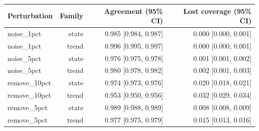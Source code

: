 \begin{tabular}{lrrr}
\toprule
Perturbation & Family & Agreement (95\% CI) & Lost coverage (95\% CI) \\
\midrule
noise\_1pct & state & 0.985 [0.984, 0.987] & 0.000 [0.000, 0.001] \\
noise\_1pct & trend & 0.996 [0.995, 0.997] & 0.000 [0.000, 0.001] \\
noise\_5pct & state & 0.976 [0.975, 0.978] & 0.001 [0.001, 0.002] \\
noise\_5pct & trend & 0.980 [0.978, 0.982] & 0.002 [0.001, 0.003] \\
remove\_10pct & state & 0.974 [0.973, 0.976] & 0.020 [0.018, 0.021] \\
remove\_10pct & trend & 0.953 [0.950, 0.956] & 0.032 [0.029, 0.034] \\
remove\_5pct & state & 0.989 [0.988, 0.989] & 0.008 [0.008, 0.009] \\
remove\_5pct & trend & 0.977 [0.975, 0.979] & 0.015 [0.013, 0.016] \\
\bottomrule
\end{tabular}
